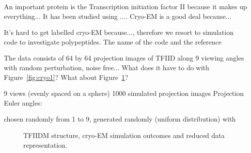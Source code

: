 An important protein is the Transcription initiation factor II because it makes up everything... It has been studied using .... Cryo-EM is a good deal because...

It's hard to get labelled cryo-EM because..., therefore we resort to simulation code to investigate polypeptides. The name of the code and the reference

The data consists of 64 by 64 projection images of TFIID along 9 viewing angles with random perturbation, noise free... What does it have to do with Figure~\ref{fig:cryo1}? What about Figure~\ref{fig:cryo2}?

9 views (evenly spaced on a sphere)
1000 simulated projection images
Projection Euler angles:

chosen randomly from 1 to 9,  generated randomly (uniform distribution) with


\begin{figure}[th]
\centering
{}
\hfil
{}
\caption{TFIIDM structure, cryo-EM simulation outcomes and reduced data representation.}
\label{fig:cryo2}
\end{figure}


